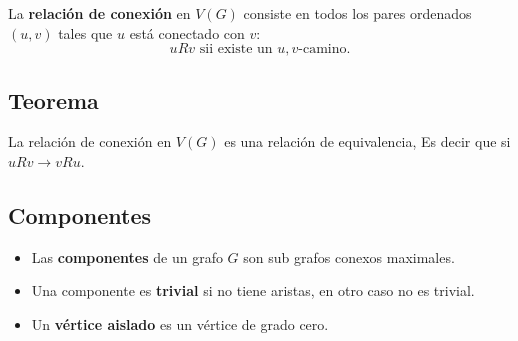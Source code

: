 \documentclass[a4paper]{book}
\begin{document}
La \textbf{relación de conexión} en \(V\left(G\right)\) consiste en todos los pares ordenados \(\left(u,v \right)\) tales que \(u\) está conectado con \(v\):
\[ uRv\text{ sii existe un } u,v\text{-camino.} \]

\subsection{Teorema}
La relación de conexión en \(V\left(G\right)\) es una relación de equivalencia,
Es decir que si \(uRv\to vRu\).

\subsection{Componentes}
\begin{itemize}
    \item Las \textbf{componentes} de un grafo \(G\) son sub grafos conexos
        maximales.
    \item Una componente es \textbf{trivial} si no tiene aristas, en otro caso
        no es trivial.
    \item  Un \textbf{vértice aislado} es un vértice de grado cero.
\end{itemize}
\end{document}
